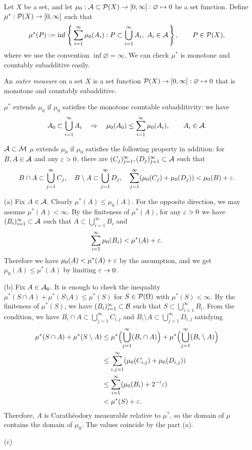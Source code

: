 \documentclass{../../large}
\begin{document}
\begin{prb}
Let $X$ be a set, and let $\mu_0:\mathcal{A}\subset\mathcal{P}(X)\to[0,\infty]:\varnothing\mapsto0$ be a set function.
Define $\mu^*:\mathcal{P}(X)\to[0,\infty]$ such that
\[\mu^*(P):=\inf\left\{\,\sum_{i=1}^\infty\mu_0(A_i):P\subset\bigcup_{i=1}^\infty A_i,\ A_i\in\mathcal{A}\,\right\},\qquad P\in\mathcal{P}(X),\]
where we use the convention $\inf\varnothing=\infty$.
We can check $\mu^*$ is monotone and countably subadditive easily.

An \emph{outer measure} on a set $X$ is a set function $\mathcal{P}(X)\to[0,\infty]:\varnothing\mapsto0$ that is monotone and countably subadditive.
\begin{parts}
\item
$\mu^*$ extends $\mu_0$ if $\mu_0$ satisfies the monotone countable subadditivity: we have
\[A_0\subset\bigcup_{i=1}^\infty A_i\quad\Rightarrow\quad\mu_0(A_0)\le\sum_{i=1}^\infty\mu_0(A_i),\qquad A_i\in\mathcal{A}.\]
\item $\mathcal{A}\subset\mathcal{M}$
$\mu$ extends $\mu_0$ if $\mu_0$ satisfies the following property in addition: for $B,A\in\mathcal{A}$ and any $\varepsilon>0$, there are $(C_j)_{j=1}^\infty,(D_j)_{j=1}^\infty\subset\mathcal{A}$ such that
\[B\cap A\subset\bigcup_{j=1}^\infty C_j,\quad B\setminus A\subset\bigcup_{j=1}^\infty D_j,\quad\sum_{j=1}^\infty(\mu_0(C_j)+\mu_0(D_j))<\mu_0(B)+\varepsilon.\]
\end{parts}
\end{prb}
\begin{pf}
(a)
Fix $A\in\mathcal{A}$.
Clearly $\mu^*(A)\le\mu_0(A)$.
For the opposite direction, we may assume $\mu^*(A)<\infty$.
By the finiteness of $\mu^*(A)$, for any $\varepsilon>0$ we have $(B_i)_{i=1}^\infty\subset\mathcal{A}$ such that $A\subset\bigcup_{i=1}^\infty B_i$ and
\[\sum_{i=1}^\infty\mu_0(B_i)<\mu^*(A)+\varepsilon.\]
Therefore we have $\mu_0(A)<\mu^*(A)+\varepsilon$ by the assumption, and we get $\mu_0(A)\le\mu^*(A)$ by limiting $\varepsilon\to0$.

(b)
Fix $A\in\mathcal{A}_0$.
It is enough to check the inequality $\mu^*(S\cap A)+\mu^*(S\setminus A)\le\mu^*(S)$ for $S\in\mathcal{P}(\Omega)$ with $\mu^*(S)<\infty$.
By the finiteness of $\mu^*(S)$, we have $(B_i)_{i=1}^\infty\subset\mathcal{B}$ such that $S\subset\bigcup_{i=1}^\infty B_i$.
From the condition, we have $B_i\cap A\subset\bigcup_{j=1}^\infty C_{i,j}$ and $B_i\setminus A\subset\bigcup_{j=1}^\infty D_{i,j}$ satisfying
\begin{align*}
\mu^*(S\cap A)+\mu^*(S\setminus A)
&\le\mu^*\Bigl(\bigcup_{j=1}^\infty(B_i\cap A)\Bigr)+\mu^*\Bigl(\bigcup_{j=1}^\infty(B_i\setminus A)\Bigr)\\
&\le\sum_{i,j=1}^\infty(\mu_0(C_{i,j})+\mu_0(D_{i,j}))\\
&\le\sum_{i=1}^\infty(\mu_0(B_i)+2^{-i}\varepsilon)\\
&<\mu^*(S)+\varepsilon.
\end{align*}
Therefore, $A$ is Carath\'eodory measurable relative to $\mu^*$, so the domain of $\mu$ contains the domain of $\mu_0$.
The values coincide by the part (a).

(c)

\end{pf}
\end{document}
